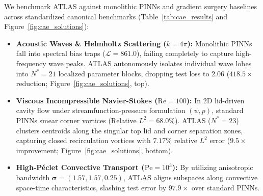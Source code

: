 \documentclass[10pt,a4paper,twocolumn]{article}
\begin{document}
\begin{table}[h!]
\centering
\caption{\textbf{Quantitative Test Loss Comparison on Key CAE Benchmarks.} Evaluated on $10{,}000$ held-out test points.}
\label{tab:cae_results}
\scriptsize
{}
\end{table}

We benchmark ATLAS against monolithic PINNs and gradient surgery baselines across standardized canonical benchmarks (Table~\ref{tab:cae_results} and Figure~\ref{fig:cae_solutions}):
\begin{itemize}
    \item \textbf{Acoustic Waves \& Helmholtz Scattering ($k=4\pi$):} Monolithic PINNs fall into spectral bias traps ($\mathcal{L} = 861.0$), failing completely to capture high-frequency wave peaks. ATLAS autonomously isolates individual wave lobes into $N^*=21$ localized parameter blocks, dropping test loss to $\mathbf{2.06}$ ($\mathbf{418.5\times}$ reduction; Figure~\ref{fig:cae_solutions}, top).
    \item \textbf{Viscous Incompressible Navier-Stokes ($\mathrm{Re}=100$):} In 2D lid-driven cavity flow under streamfunction-pressure formulation $(\psi, p)$, standard PINNs smear corner vortices (Relative $L^2 = 68.0\%$). ATLAS ($N^*=23$) clusters centroids along the singular top lid and corner separation zones, capturing closed recirculation vortices with $\mathbf{7.17\%}$ relative $L^2$ error ($\mathbf{9.5\times}$ improvement; Figure~\ref{fig:cae_solutions}, bottom).
    \item \textbf{High-P\'eclet Convective Transport ($\mathrm{Pe}=10^3$):} By utilizing anisotropic bandwidth $\boldsymbol{\sigma} = (1.57, 1.57, 0.25)$, ATLAS aligns subspaces along convective space-time characteristics, slashing test error by $\mathbf{97.9\times}$ over standard PINNs.
\end{itemize}
\end{document}
